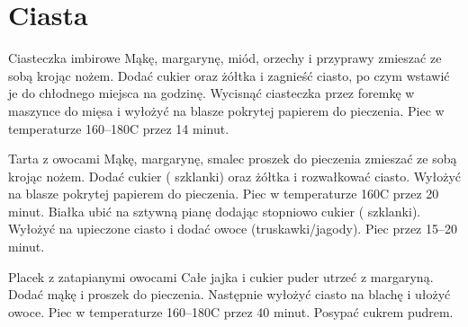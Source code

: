 \documentclass[a4paper,12pt]{article}
\begin{document}
\tableofcontents



\newpage
\section{Ciasta}

\begin{recipe}{Ciasteczka imbirowe}{}{}
Mąkę, margarynę, miód, orzechy i przyprawy zmieszać ze sobą krojąc nożem.
Dodać cukier oraz żółtka i zagnieść ciasto, po czym wstawić je do chłodnego miejsca na godzinę.
Wycisnąć ciasteczka przez foremkę w maszynce do mięsa i wyłożyć na blasze pokrytej papierem do pieczenia. Piec w temperaturze 160--180\0C przez 14 minut.
\end{recipe}

\begin{recipe}{Tarta z owocami}{}{}
Mąkę, margarynę, smalec proszek do pieczenia zmieszać ze sobą krojąc nożem. 
Dodać cukier ( szklanki) oraz żółtka i rozwałkować ciasto. 
Wyłożyć na blasze pokrytej papierem do pieczenia. Piec w temperaturze 160\0C przez 20 minut.
Białka ubić na sztywną pianę dodając stopniowo cukier ( szklanki). Wyłożyć na upieczone ciasto i dodać owoce (truskawki/jagody). Piec przez 15--20 minut.
\end{recipe}

\begin{recipe}{Placek z zatapianymi owocami}{}{}
Całe jajka i cukier puder utrzeć z margaryną. Dodać mąkę i proszek do pieczenia. Następnie wyłożyć ciasto na blachę i ułożyć owoce. Piec w temperaturze 160--180\0C przez 40 minut. Posypać cukrem pudrem.
\end{recipe}
\end{document}

